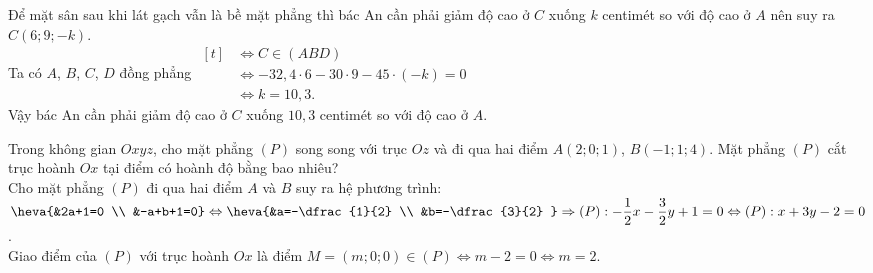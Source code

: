 \begin{ex}
{		Để mặt sân sau khi lát gạch vẫn là bề mặt phẳng thì bác An cần phải giảm độ cao ở $C$ xuống $k$ centimét so với độ cao ở $A$ nên suy ra $C(6; 9; -k)$.\\
		Ta có $A$, $B$, $C$, $D$ đồng phẳng	$\begin{aligned}[t]
			&\Leftrightarrow C \in (ABD)\\
			&\Leftrightarrow -32{,}4\cdot 6 -30 \cdot 9 -45\cdot (-k)=0\\
			&\Leftrightarrow k=10{,}3.
		\end{aligned}$\\
		Vậy bác An cần phải giảm độ cao ở $C$ xuống $10{,}3$ centimét so với độ cao ở $A$.
	}
\end{ex}

\begin{ex} %
	Trong không gian $Oxyz$, cho mặt phẳng $(P)$ song song với trục $Oz$ và đi qua hai điểm $A(2; 0; 1)$, $B(-1; 1; 4)$. Mặt phẳng $(P)$ cắt trục hoành $Ox$ tại điểm có hoành độ bằng bao nhiêu?
		\\
		 Cho mặt phẳng $(P)$ đi qua hai điểm $A$ và $B$ suy ra hệ phương trình:\\
		 $\heva{&2a+1=0 \\ &-a+b+1=0} \Leftrightarrow \heva{&a=-\dfrac{1}{2} \\ &b=-\dfrac{3}{2} }\Rightarrow (P): -\dfrac{1}{2}x-\dfrac{3}{2}y+1=0 \Leftrightarrow (P): x+3y-2=0$.\\
		 Giao điểm của $(P)$ với trục hoành $Ox$ là điểm $M=(m;0;0) \in (P) \Leftrightarrow m-2=0 \Leftrightarrow m=2$.

\end{ex}

